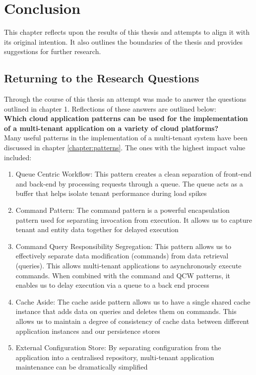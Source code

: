 \chapter{Conclusion}

This chapter reflects upon the results of this thesis and attempts to align it with its original intention. It also outlines the boundaries of the thesis and provides suggestions for further research. 


\section{Returning to the Research Questions}
Through the course of this thesis an attempt was made to answer the questions outlined in chapter 1. Reflections of these answers are outlined below: 
\\
\textbf{Which cloud application patterns can be used for the implementation of a multi-tenant application on a variety of cloud platforms?}
\\
Many useful patterns in the implementation of a multi-tenant system have been discussed in chapter \ref{chapter:patterns}. The ones with the highest impact value included:
\vfill
\begin{enumerate}
\item Queue Centric Workflow: This pattern creates a clean separation of front-end and back-end by processing requests through a queue. The queue acts as a buffer that helps isolate tenant performance during load spikes
\item Command Pattern: The command pattern is a powerful encapsulation pattern used for separating invocation from execution. It allows us to capture tenant and entity data together for delayed execution
\item Command Query Responsibility Segregation: This pattern allows us to effectively separate data modification (commands) from data retrieval (queries). This allows multi-tenant applications to asynchronously execute commands. When combined with the command and QCW patterns, it enables us to delay execution via a queue to a back end process
\item Cache Aside: The cache aside pattern allows us to have a single shared cache instance that adds data on queries and deletes them on commands. This allows us to maintain a degree of consistency of cache data between different application instances and our persistence stores
\item External Configuration Store: By separating configuration from the application into a centralised repository, multi-tenant application maintenance can be dramatically simplified
\end{enumerate}

